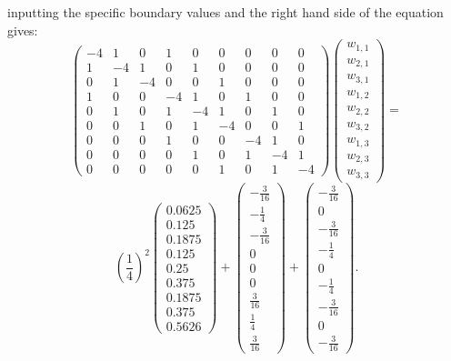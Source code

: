 inputting the specific boundary values and the right hand side of the equation gives:
\[\left(\begin{array}{ccccccccc}
-4& 1 & 0 &1 &0 &0 &0 &0 &0\\
1&-4& 1 & 0 &1 &0 &0 &0 &0 \\
0 &1&-4&  0&0 &1 &0 &0 &0 \\
1 &0 &0 &-4& 1 & 0 &1 &0 &0\\
0 & 1 &0 &1&-4& 1 &0 &1 &0  \\
0 &0 &1 &0 &1&-4&0&  0 &1  \\
0&0&0&1 &0 &0 &-4& 1 & 0\\
0&0&0&0 & 1 &0 &1&-4& 1   \\
0&0&0&0 &0 &1 &0 &1&-4
\end{array}\right)
\left(\begin{array}{c}
w_{1,1}\\
w_{2,1}\\
w_{3,1}\\
w_{1,2}\\
w_{2,2}\\
w_{3,2}\\
w_{1,3}\\
w_{2,3}\\
w_{3,3}
\end{array}\right)=\]
\[
\left(\frac{1}{4}\right)^2\left(\begin{array}{c}
0.0625\\
0.125\\
0.1875 \\
0.125\\
 0.25\\
0.375\\
0.1875\\
0.375\\
0.5626
\end{array}\right)
+\left(\begin{array}{c}
-\frac{3}{16}\\
-\frac{1}{4}\\
-\frac{3}{16}\\
0\\
0\\
0\\
\frac{3}{16}\\
\frac{1}{4}\\
\frac{3}{16}
\end{array}\right)
+\left(\begin{array}{c}
-\frac{3}{16}\\
0\\
-\frac{3}{16}\\
-\frac{1}{4}\\
0\\
-\frac{1}{4}\\
-\frac{3}{16}\\
0\\
-\frac{3}{16}
\end{array}\right).
\]	
